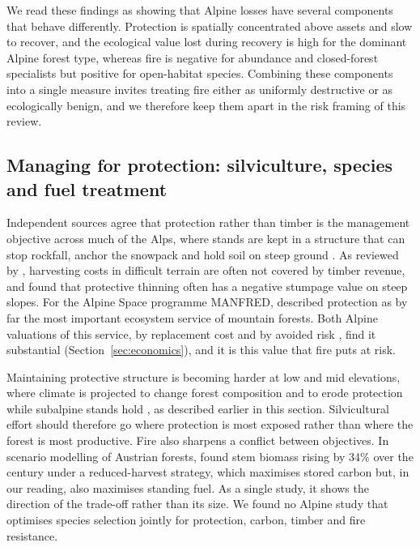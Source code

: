 \documentclass[11pt,a4paper]{article}
\begin{document}
We read these findings as showing that Alpine losses have several components that behave differently. Protection is spatially concentrated above assets and slow to recover, and the ecological value lost during recovery is high for the dominant Alpine forest type, whereas fire is negative for abundance and closed-forest specialists but positive for open-habitat species. Combining these components into a single measure invites treating fire either as uniformly destructive or as ecologically benign, and we therefore keep them apart in the risk framing of this review.
\subsection{Managing for protection: silviculture, species and fuel treatment}

Independent sources agree that protection rather than timber is the management objective across much of the Alps, where stands are kept in a structure that can stop rockfall, anchor the snowpack and hold soil on steep ground \citep{dinca_timber_2025, jandl_management_2013, accastello_asforesee_2019}. As reviewed by \citet{dinca_timber_2025}, harvesting costs in difficult terrain are often not covered by timber revenue, and \citet{accastello_asforesee_2019} found that protective thinning often has a negative stumpage value on steep slopes. For the Alpine Space programme MANFRED, \citet{jandl_management_2013} described protection as by far the most important ecosystem service of mountain forests. Both Alpine valuations of this service, by replacement cost \citep{accastello_asforesee_2019} and by avoided risk \citep{moos_climate_2021}, find it substantial (Section~\ref{sec:economics}), and it is this value that fire puts at risk.

Maintaining protective structure is becoming harder at low and mid elevations, where climate is projected to change forest composition \citep{schumacher_relative_2006} and to erode protection while subalpine stands hold \citep{hillebrand_contrasting_2023, moos_climate_2021}, as described earlier in this section. Silvicultural effort should therefore go where protection is most exposed rather than where the forest is most productive. Fire also sharpens a conflict between objectives. In scenario modelling of Austrian forests, \citet{jandl_strategies_2018} found stem biomass rising by 34\% over the century under a reduced-harvest strategy, which maximises stored carbon but, in our reading, also maximises standing fuel. As a single study, it shows the direction of the trade-off rather than its size. We found no Alpine study that optimises species selection jointly for protection, carbon, timber and fire resistance.
\end{document}
